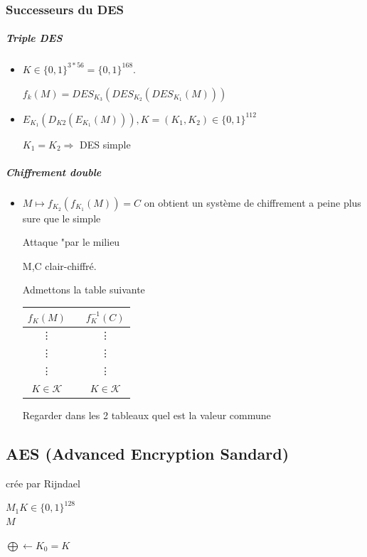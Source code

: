 \documentclass[12pt,a4paper]{article}
\begin{document}
\subsubsection{Successeurs du DES}

\subparagraph{Triple DES}
\begin{itemize}
\item $K \in  \{0,1\}^{3*56} = \{0,1\}^{168}$.

$f_k(M) = DES_{K_3}(DES_{K_2}(DES_{K_1}(M)))$

\item $E_{K_1}(D_{K2}(E_{K_1}(M))), K=(K_1,K_2)\in \{0,1\}^{112}$

$K_1=K_2 \Rightarrow$ DES simple

\end{itemize}
\subparagraph{Chiffrement double}

\begin{itemize}
\item $ M \longmapsto f_{K_2}(f_{K_1} (M)) =C $ on obtient un système de chiffrement a peine plus sure que le simple

Attaque "par le milieu

M,C clair-chiffré.

Admettons la table suivante

\begin{tabular}{|c|c|c|}
\hline $f_K(M)$ &  & $f_K^{-1}(C)$ \\ 
\hline \vdots &  & \vdots \\ 
\hline \vdots &  & \vdots \\ 
\hline \vdots &  & \vdots \\ 
\hline $K \in \mathcal{K}$ &  & $K \in \mathcal{K}$ \\
\hline 
\end{tabular} 

Regarder dans les 2 tableaux quel est la valeur commune

\end{itemize}

\subsection{AES (Advanced Encryption Sandard)}

crée par Rijndael

$M_1 K \in \{0,1\}^{128}$
\\ 

$M$

$\bigoplus \longleftarrow K_0 = K$
\end{document}
